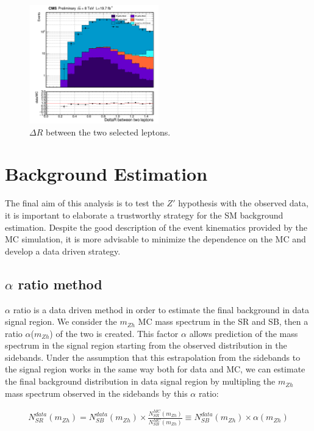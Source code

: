 \begin{figure}[hbtp]
  \begin{center}
    \includegraphics[width=0.5\textwidth]{figure/CH3/Z_kinematics/h_DeltaRll.png}
  \end{center}
  \caption{\label{fig:DeltaRll}$\Delta R$ between the two selected leptons.}
\end{figure}

\newpage
\section{Background Estimation}

The final aim of this analysis is to test the $Z'$ hypothesis with the observed data, it is important to elaborate a trustworthy strategy for the SM background estimation. Despite the good description of the event kinematics provided by the MC simulation, it is more advisable to minimize the dependence on the MC and develop a data driven strategy.

\subsection{$\alpha$ ratio method}

$\alpha$ ratio is a data driven method in order to estimate the final background in data signal region. We consider the $m_{Zh}$ MC mass spectrum in the SR and SB, then a ratio $\alpha$($m_{Zh}$) of the two is created. This factor $\alpha$ allows prediction of the mass spectrum in the signal region starting from the observed distribution in the sidebands. Under the assumption that this estrapolation from the sidebands to the signal region works in the same way both for data and MC, we can estimate the final background distribution in data signal region by multipling the $m_{Zh}$ mass spectrum observed in the sidebands by this $\alpha$ ratio:

\begin{align}
  \label{eq:AlphaRatio}
  N_{SR}^{data}(m_{Zh}) = N_{SB}^{data}(m_{Zh})\times \frac{N^{MC}_{SR}(m_{Zh})}{N^{MC}_{SB}(m_{Zh})}\equiv N_{SB}^{data}(m_{Zh})\times \alpha (m_{Zh})
\end{align}

